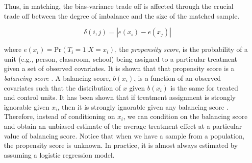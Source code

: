 {{Thus, in matching, the bias-variance trade off is affected through the crucial trade off between the degree of imbalance and the size of the matched sample. }







$$\delta(i,j) =|e(x_i)-e(x_j)|$$

\noindent where $ e(x_i)=\textrm{Pr}(T_i=1|X=x_i)$, the {\em propensity score},  is the probability of a
 unit (e.g., person, classroom, school) being assigned to a particular treatment
 given a set of observed covariates. It is shown that that propensity score is a {\em balancing score} \cite{Rubin1983b}.
  A balancing score, $b(x_i)$, is a function of an observed covariates such
  that the distribution of $x$ given $b(x_i)$ is the same for treated and
  control units. It has been shown that if
  treatment assignment is strongly ignorable given $x_i$, then it is strongly
   ignorable given any balancing score \cite{Rubin1983b}. Therefore, instead of conditioning on $x_i$, we can condition on the balancing score and obtain an unbiased
     estimate of the average treatment effect at a particular value of balancing score.   Notice that when we have a sample from a population, the propensity score is unknown. In practice, it is almost always estimated by assuming a logistic regression model.

}
